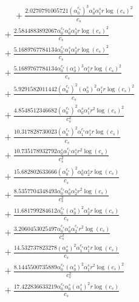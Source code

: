 \documentclass[10pt]{article}
\begin{document}
\begin{align*}
\phantom{R_{3,7}} &\phantom{={}}{}  + \frac{2.0270791005721 \left(\alpha_{0}^{c_s}\right)^{3} \alpha_{0}^s \alpha_{1}^s r \log{\left(c_{s} \right)}^{2}}{c_{s}} \\
&{}  + \frac{2.5844883892067 \alpha_{0}^{c_s} \alpha_{0}^s \alpha_{3}^s r \log{\left(c_{s} \right)}^{2}}{c_{s}} \\
&{}  + \frac{5.1689767784134 \alpha_{0}^{c_s} \alpha_{1}^s \alpha_{2}^s r \log{\left(c_{s} \right)}^{2}}{c_{s}} \\
&{}  + \frac{5.1689767784134 \alpha_{0}^{c_s} \left(\alpha_{0}^s\right)^{3} \alpha_{1}^s r \log{\left(c_{s} \right)}^{2}}{c_{s}} \\
&{}  + \frac{5.9291582011442 \left(\alpha_{0}^{c_s}\right)^{2} \left(\alpha_{0}^s\right)^{2} \alpha_{1}^s r \log{\left(c_{s} \right)}^{2}}{c_{s}} \\
&{}  + \frac{4.8548512346682 \left(\alpha_{0}^{c_s}\right)^{2} \alpha_{0}^s \alpha_{1}^s r^{2} \log{\left(c_{s} \right)}^{2}}{c_{s}^{2}} \\
&{}  + \frac{10.317828730023 \left(\alpha_{0}^{c_s}\right)^{2} \alpha_{1}^{c_s} \alpha_{1}^s r \log{\left(c_{s} \right)}}{c_{s}} \\
&{}  + \frac{10.735178932792 \alpha_{0}^s \alpha_{1}^{c_s} \alpha_{1}^s r^{2} \log{\left(c_{s} \right)}}{c_{s}^{2}} \\
&{}  + \frac{15.682802633666 \left(\alpha_{0}^{c_s}\right)^{2} \alpha_{0}^s \alpha_{2}^s r \log{\left(c_{s} \right)}}{c_{s}} \\
&{}  + \frac{8.5357704348493 \alpha_{0}^{c_s} \alpha_{0}^s \alpha_{2}^s r^{2} \log{\left(c_{s} \right)}}{c_{s}^{2}} \\
&{}  + \frac{11.681799284612 \alpha_{0}^{c_s} \left(\alpha_{0}^s\right)^{2} \alpha_{2}^s r \log{\left(c_{s} \right)}}{c_{s}} \\
&{}  + \frac{3.2060453025497 \alpha_{0}^{c_s} \alpha_{0}^s \alpha_{2}^{c_s} r^{2} \log{\left(c_{s} \right)}}{c_{s}^{2}} \\
&{}  + \frac{14.532737823278 \left(\alpha_{0}^s\right)^{2} \alpha_{1}^{c_s} \alpha_{1}^s r \log{\left(c_{s} \right)}}{c_{s}} \\
&{}  + \frac{8.1445500735889 \alpha_{0}^{c_s} \left(\alpha_{0}^s\right)^{2} \alpha_{1}^s r^{2} \log{\left(c_{s} \right)}^{2}}{c_{s}^{2}} \\
&{}  + \frac{17.422836633219 \alpha_{0}^{c_s} \alpha_{0}^s \left(\alpha_{1}^s\right)^{2} r \log{\left(c_{s} \right)}}{c_{s}} \\

\end{align*}
\end{document}
